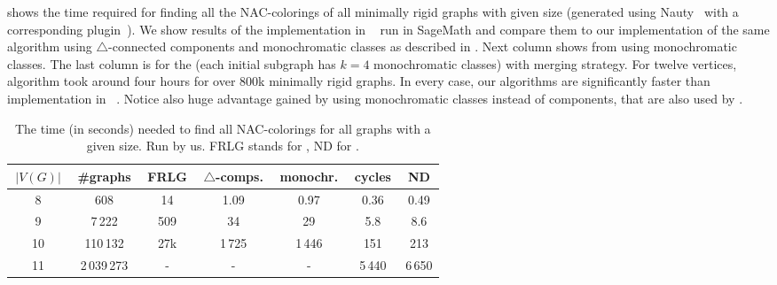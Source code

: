 shows the time required for finding all the NAC-colorings
of all minimally rigid graphs with given size (generated using Nauty~\cite{nauty}
with a corresponding plugin~\cite{nauty_plugin}).
We show results of the implementation in \flexrilog{}~\cite{flexrilog} run in SageMath
and compare them to our implementation of the same \Naive{} algorithm
using $\triangle$-connected components
and monochromatic classes as described in .
Next column shows \NaiveCycles{} from 
using monochromatic classes.
The last column is for the \NeighborsDegree{} (each initial subgraph has $k=4$ monochromatic classes)
with \MergeLinear{} merging strategy.
For twelve vertices, \Neighbors{} algorithm took around four hours for over 800k minimally rigid graphs.
In every case, our algorithms are significantly faster than implementation in \flexrilog{}~\cite{flexrilog}.
Notice also huge advantage gained by using monochromatic classes instead of \trcon{} components,
that are also used by \flexrilog{}.
%
\begin{table}[ht]
	\caption[Running times on graphs.]{
		The time (in seconds) needed to find all NAC-colorings for all graphs with a given size. Run by us.
		\textsc{FRLG} stands for \flexrilog{}, \textsc{ND} for \NeighborsDegree{}.}%
	\label{tab:all_min_rigid}
	\vspace{0.3cm}
	\centering
	\begin{tabular}{ccccccc}
		\hline
		\,$|V(G)|$\, & \,\#graphs\, & \,FRLG\, & \,$\triangle$-comps.\, & \,monochr.\, & \,cycles\, & \,\textsc{ND}\, \\
		\hline
		8            & 608          & 14       & 1.09                   & 0.97         & 0.36       & 0.49            \\
		9            & 7\,222       & 509      & 34                     & 29           & 5.8        & 8.6             \\
		10           & 110\,132     & 27k      & 1\,725                 & 1\,446       & 151        & 213             \\
		11           & 2\,039\,273  & -        & -                      & -            & 5\,440     & 6\,650          \\
		\hline
	\end{tabular}
\end{table}

